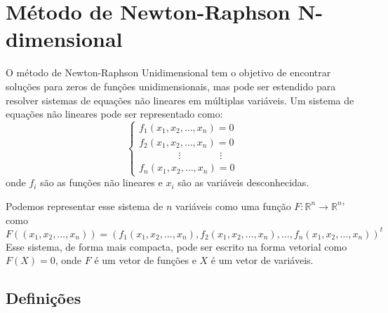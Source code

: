 \section{Método de Newton-Raphson N-dimensional}
O método de Newton-Raphson Unidimensional tem o objetivo de encontrar soluções para zeros de funções unidimensionais, mas pode ser estendido para resolver sistemas de equações não lineares em múltiplas variáveis. Um sistema de equações não lineares pode ser representado como:
\begin{equation*}
    \begin{cases}
    f_1(x_1, x_2, \ldots, x_n) = 0 \\
    f_2(x_1, x_2, \ldots, x_n) = 0 \\
            \qquad \qquad \vdots \qquad \qquad  \vdots \\
    f_n(x_1, x_2, \ldots, x_n) = 0
    \end{cases}
\end{equation*}
onde  \(f_i \) são as funções não lineares e \(x_i\) são as variáveis desconhecidas.

Podemos representar esse sistema de \textbf{\(n\)} variáveis como uma função \textbf{\(F : \mathbb{R}^n \rightarrow \mathbb{R}^n\)}' como
\begin{equation*}
    F((x_1, x_2, \ldots, x_n)) = (f_1(x_1, x_2, \ldots, x_n), f_2(x_1, x_2, \ldots, x_n), \ldots, f_n(x_1, x_2, \ldots, x_n))^{t}
\end{equation*}
Esse sistema, de forma mais compacta, pode ser escrito na forma vetorial como \textbf{\(F(X) = 0\)}, onde \textbf{\(F\)} é um vetor de funções e \(X\) é um vetor de variáveis.

\subsection{Definições}

